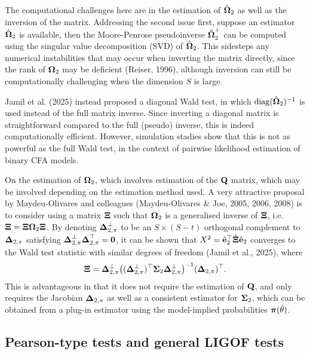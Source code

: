 \documentclass[
  letterpaper,
  DIV=11,
  numbers=noendperiod]{scrartcl}
\begin{document}
The computational challenges here are in the estimation of
\(\hat{{\boldsymbol\Omega}}_2\) as well as the inversion of the matrix. Addressing the
second issue first, suppose an estimator \(\hat{{\boldsymbol\Omega}}_2\) is available,
then the Moore-Penrose pseudoinverse \(\hat{{\boldsymbol\Omega}}_2^+\) can be computed
using the singular value decomposition (SVD) of \(\hat{{\boldsymbol\Omega}}_2\). This
sidesteps any numerical instabilities that may occur when inverting the
matrix directly, since the rank of \({\boldsymbol\Omega}_2\) may be deficient
(Reiser, 1996), although inversion can still be computationally
challenging when the dimension \(S\) is large.

Jamil et al. (2025) instead proposed a diagonal Wald test, in which
\(\operatorname{diag}(\hat{{\boldsymbol\Omega}}_2)^{-1}\) is used instead of the full matrix
inverse. Since inverting a diagonal matrix is straightforward compared
to the full (pseudo) inverse, this is indeed computationally efficient.
However, simulation stadies show that this is not as powerful as the
full Wald test, in the context of pairwise likelihood estimation of
binary CFA models.

On the estimation of \({\boldsymbol\Omega}_2\), which involves estimation of the
\({\mathbf Q}\) matrix, which may be involved depending on the estimation method
used. A very attractive proposal by Maydeu-Olivares and colleagues
(Maydeu-Olivares \& Joe, 2005, 2006, 2008) is to consider using a matrix
\({\boldsymbol\Xi}\) such that \({\boldsymbol\Omega}_2\) is a generalised inverse of \({\boldsymbol\Xi}\),
i.e.~\({\boldsymbol\Xi} = {\boldsymbol\Xi} {\boldsymbol\Omega}_2 {\boldsymbol\Xi}\). By denoting
\({\boldsymbol\Delta}_{2,\pi}^\perp\) to be an \(S\times (S-t)\) orthogonal
complement to \({\boldsymbol\Delta}_{2,\pi}\) satisfying
\({\boldsymbol\Delta}_{2,\pi}^\perp {\boldsymbol\Delta}_{2,\pi}^\top = {\mathbf 0}\), it can be shown
that \(X^2 = \hat{{\mathbf e}}_2^\top \hat{{\boldsymbol\Xi}} \hat{{\mathbf e}}_2\) converges to the Wald
test statistic with similar degrees of freedom (Jamil et al., 2025),
where \[
{\boldsymbol\Xi} = {\boldsymbol\Delta}_{2,\pi}^\perp \big( ({\boldsymbol\Delta}_{2,\pi}^\perp)^\top {\boldsymbol\Sigma}_2 {\boldsymbol\Delta}_{2,\pi}^\perp \big)^{-1} ({\boldsymbol\Delta}_{2,\pi})^\top.
\] This is advantageous in that it does not require the estimation of
\({\mathbf Q}\), and only requires the Jacobian \({\boldsymbol\Delta}_{2,\pi}\) as well as a
consistent estimator for \({\boldsymbol\Sigma}_2\), which can be obtained from a
plug-in estimator using the model-implied probabilities
\({\boldsymbol\pi}(\hat\theta)\).

\subsection{Pearson-type tests and general LIGOF
tests}\label{pearson-type-tests-and-general-ligof-tests}
\end{document}
